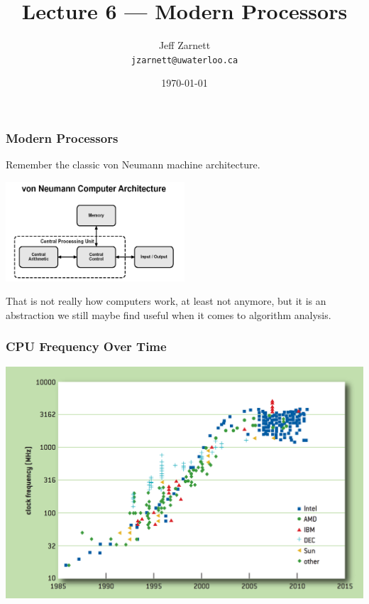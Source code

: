 

\title{Lecture 6 --- Modern Processors }

\author{Jeff Zarnett \\ \small \texttt{jzarnett@uwaterloo.ca}}
\date{\today}




\begin{frame}
  \titlepage

\end{frame}



\begin{frame}
\frametitle{Modern Processors}


Remember the classic von Neumann machine architecture. 

\begin{center}
	\includegraphics[width=0.5\textwidth]{images/vonNeumann.png}
\end{center}

 That is not really how computers work, at least not anymore, but it is an abstraction we still maybe find useful when it comes to algorithm analysis.

\end{frame}



\begin{frame}
\frametitle{CPU Frequency Over Time}


\begin{center}
\includegraphics[width=\textwidth]{images/cpu-frequency}
\end{center}

\end{frame}



